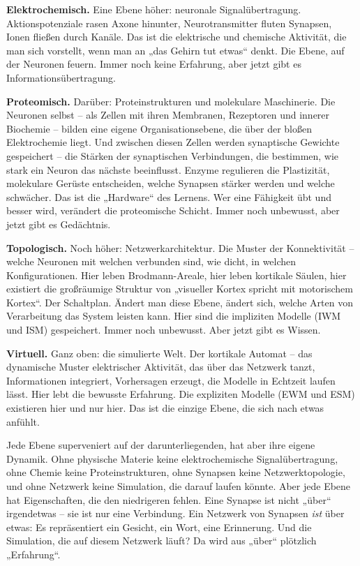 \documentclass[11pt, twoside, openright]{book}
\begin{document}
\textbf{Elektrochemisch.} Eine Ebene höher: neuronale Signalübertragung. Aktionspotenziale rasen Axone hinunter, Neurotransmitter fluten Synapsen, Ionen fließen durch Kanäle. Das ist die elektrische und chemische Aktivität, die man sich vorstellt, wenn man an „das Gehirn tut etwas“ denkt. Die Ebene, auf der Neuronen feuern. Immer noch keine Erfahrung, aber jetzt gibt es Informationsübertragung.

\textbf{Proteomisch.} Darüber: Proteinstrukturen und molekulare Maschinerie. Die Neuronen selbst -- als Zellen mit ihren Membranen, Rezeptoren und innerer Biochemie -- bilden eine eigene Organisationsebene, die über der bloßen Elektrochemie liegt. Und zwischen diesen Zellen werden synaptische Gewichte gespeichert -- die Stärken der synaptischen Verbindungen, die bestimmen, wie stark ein Neuron das nächste beeinflusst. Enzyme regulieren die Plastizität, molekulare Gerüste entscheiden, welche Synapsen stärker werden und welche schwächer. Das ist die „Hardware“ des Lernens. Wer eine Fähigkeit übt und besser wird, verändert die proteomische Schicht. Immer noch unbewusst, aber jetzt gibt es Gedächtnis.

\textbf{Topologisch.} Noch höher: Netzwerkarchitektur. Die Muster der Konnektivität -- welche Neuronen mit welchen verbunden sind, wie dicht, in welchen Konfigurationen. Hier leben Brodmann-Areale, hier leben kortikale Säulen, hier existiert die großräumige Struktur von „visueller Kortex spricht mit motorischem Kortex“. Der Schaltplan. Ändert man diese Ebene, ändert sich, welche Arten von Verarbeitung das System leisten kann. Hier sind die impliziten Modelle (IWM und ISM) gespeichert. Immer noch unbewusst. Aber jetzt gibt es Wissen.

\textbf{Virtuell.} Ganz oben: die simulierte Welt. Der kortikale Automat -- das dynamische Muster elektrischer Aktivität, das über das Netzwerk tanzt, Informationen integriert, Vorhersagen erzeugt, die Modelle in Echtzeit laufen lässt. Hier lebt die bewusste Erfahrung. Die expliziten Modelle (EWM und ESM) existieren hier und nur hier. Das ist die einzige Ebene, die sich nach etwas anfühlt.

Jede Ebene superveniert auf der darunterliegenden, hat aber ihre eigene Dynamik. Ohne physische Materie keine elektrochemische Signalübertragung, ohne Chemie keine Proteinstrukturen, ohne Synapsen keine Netzwerktopologie, und ohne Netzwerk keine Simulation, die darauf laufen könnte. Aber jede Ebene hat Eigenschaften, die den niedrigeren fehlen. Eine Synapse ist nicht „über“ irgendetwas -- sie ist nur eine Verbindung. Ein Netzwerk von Synapsen \textit{ist} über etwas: Es repräsentiert ein Gesicht, ein Wort, eine Erinnerung. Und die Simulation, die auf diesem Netzwerk läuft? Da wird aus „über“ plötzlich „Erfahrung“.
\end{document}
